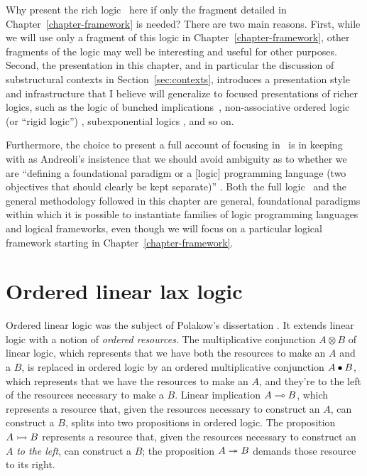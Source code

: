 Why present the rich logic \ollll~here
if only the fragment detailed in Chapter~\ref{chapter-framework} 
is needed? There are two
main reasons.  First, while we will use only a fragment of this logic
in Chapter~\ref{chapter-framework}, 
other fragments of the logic may well be interesting and
useful for other purposes. Second, the presentation in this chapter,
and in particular the discussion of substructural contexts in
Section~\ref{sec:contexts}, introduces a presentation style and
infrastructure that I believe will generalize to focused presentations
of richer logics, such as the logic of bunched
implications~\cite{pym02semantics}, non-associative ordered logic (or
``rigid logic'') \cite{simmons09linear}, subexponential logics
\cite{nigam09algorithmic}, and so on.

Furthermore, the choice to present a full account of focusing in
\ollll~is in keeping with as Andreoli's insistence that we should
avoid ambiguity as to whether we are ``defining a foundational
paradigm or a [logic] programming language (two objectives that should
clearly be kept separate)'' \cite{andreoli01focussing}. Both the full
logic \ollll~and the general methodology followed in this chapter are
general, foundational paradigms within which it is possible to
instantiate families of logic programming languages and logical
frameworks, even though we will focus on a particular logical
framework starting in Chapter~\ref{chapter-framework}.

\section{Ordered linear lax logic}
\label{sec:ord-unfocused}

Ordered linear logic was the subject of Polakow's dissertation
\cite{polakow01ordered}. It extends linear logic with a notion of {\it
  ordered resources}.  The 
multiplicative conjunction $A \otimes B$ of linear logic, which
represents that we have both the resources to make an $A$ and a $B$,
is replaced in ordered logic
by an ordered multiplicative conjunction $A \mathbin{\bullet} B$, which
represents that we have the resources to make an $A$, and they're to
the left of the resources necessary to make a $B$. Linear implication
$A \multimap B$, which represents a resource that, given the resources
necessary to construct an $A$, can construct a $B$, splits into two
propositions in ordered logic. The proposition $A \rightarrowtail B$ represents
a resource that, given the resources necessary to construct an $A$
{\it to the left}, can construct a $B$; the proposition $A \twoheadrightarrow
B$ demands those resource to its right. 

